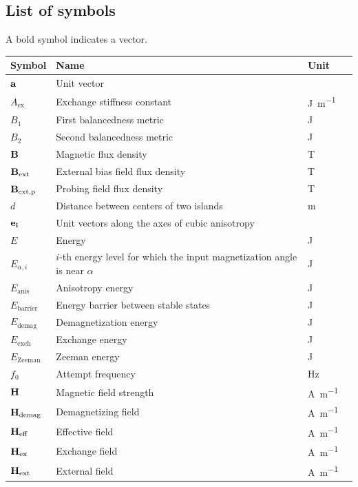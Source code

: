 \documentclass[11pt,a4paper,english]{article}
\begin{document}
\subsection*{List of symbols}
A bold symbol indicates a vector.
\begin{longtable}{llll}
\toprule
\bfseries Symbol & \bfseries Name &
\bfseries Unit \\\midrule\endhead
$\vb{a}$ & Unit vector & \\
$A_\mathrm{ex}$ & Exchange stiffness constant & \si{\joule\per\metre} \\
$B_1$ & First balancedness metric & \si{\joule} \\
$B_2$ & Second balancedness metric & \si{\joule} \\
$\vb{B}$ & Magnetic flux density & \si{\tesla} \\
$\vb{B_\mathrm{ext}}$ & External bias field flux density & \si{\tesla} \\
$\vb{B_\mathrm{ext,p}}$ & Probing field flux density & \si{\tesla} \\
$d$ & Distance between centers of two islands & \si{\metre} \\
$\vb{e_i}$ & Unit vectors along the axes of cubic anisotropy &  \\
$E$ & Energy & \si{\joule} \\
$E_{\alpha,i}$ & $i$-th energy level for which the input magnetization angle is near $\alpha$ & \si{\joule} \\ 
$E_\mathrm{anis}$ & Anisotropy energy & \si{\joule} \\
$E_\mathrm{barrier}$ & Energy barrier between stable states & \si{\joule} \\
$E_\mathrm{demag}$ & Demagnetization energy & \si{\joule} \\
$E_\mathrm{exch}$ & Exchange energy & \si{\joule} \\
$E_\mathrm{Zeeman}$ & Zeeman energy & \si{\joule} \\
$f_0$ & Attempt frequency & \si{\hertz} \\
$\vb{H}$ & Magnetic field strength & \si{\ampere\per\metre} \\
$\vb{H_\mathrm{demag}}$ & Demagnetizing field & \si{\ampere\per\metre} \\
$\vb{H_\mathrm{eff}}$ & Effective field & \si{\ampere\per\metre} \\
$\vb{H_\mathrm{ex}}$ & Exchange field & \si{\ampere\per\metre} \\
$\vb{H_\mathrm{ext}}$ & External field & \si{\ampere\per\metre} \\

\end{longtable}
\end{document}

